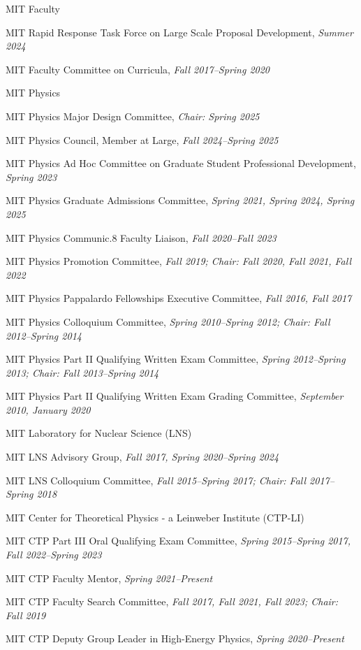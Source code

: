 \bbl
\item MIT Faculty
\bsbl 
\item MIT Rapid Response Task Force on Large Scale Proposal Development, \emph{Summer 2024}
\item MIT Faculty Committee on Curricula, \emph{Fall 2017--Spring 2020}
\el 
\item MIT Physics
\bsbl 
\item MIT Physics Major Design Committee, \emph{Chair: Spring 2025}
\item MIT Physics Council, Member at Large, \emph{Fall 2024--Spring 2025}
\item MIT Physics Ad Hoc Committee on Graduate Student Professional Development, \emph{Spring 2023}
\item MIT Physics Graduate Admissions Committee, \emph{Spring 2021, Spring 2024, Spring 2025}
\item MIT Physics Communic.8 Faculty Liaison, \emph{Fall 2020--Fall 2023}
\item MIT Physics Promotion Committee, \emph{Fall 2019; Chair: Fall 2020, Fall 2021, Fall 2022}
\item MIT Physics Pappalardo Fellowships Executive Committee, \emph{Fall 2016, Fall 2017}
\item MIT Physics Colloquium Committee, \emph{Spring 2010--Spring 2012; Chair: Fall 2012--Spring 2014}
\item MIT Physics Part II Qualifying Written Exam Committee, \emph{Spring 2012--Spring 2013; Chair: Fall 2013--Spring 2014}
\item MIT Physics Part II Qualifying Written Exam Grading Committee, \emph{September 2010, January 2020}
\el 
\item MIT Laboratory for Nuclear Science (LNS)
\bsbl 
\item MIT LNS Advisory Group, \emph{Fall 2017, Spring 2020--Spring 2024}
\item MIT LNS Colloquium Committee, \emph{Fall 2015--Spring 2017; Chair: Fall 2017--Spring 2018}
\el 
\item MIT Center for Theoretical Physics - a Leinweber Institute (CTP-LI)
\bsbl 
\item MIT CTP Part III Oral Qualifying Exam Committee, \emph{Spring 2015--Spring 2017, Fall 2022--Spring 2023}
\item MIT CTP Faculty Mentor, \emph{Spring 2021--Present}
\item MIT CTP Faculty Search Committee, \emph{Fall 2017, Fall 2021, Fall 2023; Chair: Fall 2019}
\item MIT CTP Deputy Group Leader in High-Energy Physics, \emph{Spring 2020--Present}
